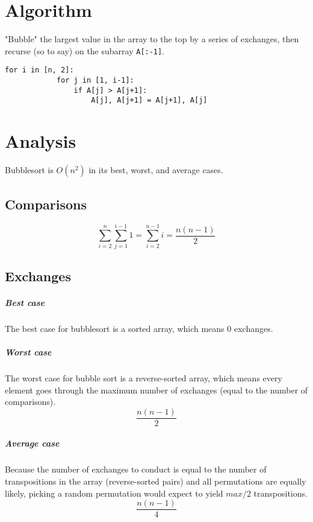 \documentclass[11pt]{article}
\begin{document}
\section{Algorithm}
	"Bubble" the largest value in the array to the top by a series of exchanges, then recurse (so to say) on the subarray \verb|A[:-1]|.

	\begin{lstlisting}[autogobble=true]
		for i in [n, 2]:
			for j in [1, i-1]:
				if A[j] > A[j+1]:
					A[j], A[j+1] = A[j+1], A[j]
	\end{lstlisting}
	
\section{Analysis}
	Bubblesort is $O(n^2)$ in its best, worst, and average cases.
	\subsection{Comparisons}
		\begin{equation}
			\sum_{i=2}^n \sum_{j=1}^{i-1} 1 = \sum_{i=2}^{n-1} i = \frac{n(n-1)}{2}
		\end{equation}
		
	\subsection{Exchanges}
		\subparagraph{Best case} The best case for bubblesort is a sorted array, which means $0$ exchanges.
		\subparagraph{Worst case} The worst case for bubble sort is a reverse-sorted array, which means every element goes through the maximum number of exchanges (equal to the number of comparisons).
			\begin{equation}
				\frac{n(n-1)}{2}
			\end{equation}
		\subparagraph{Average case} Because the number of exchanges to conduct is equal to the number of transpositions in the array (reverse-sorted pairs) and all permutations are equally likely, picking a random permutation would expect to yield $max/2$ transpositions.
			\begin{equation}
				\frac{n(n-1)}{4}
			\end{equation}

%		
%		


\end{document}
